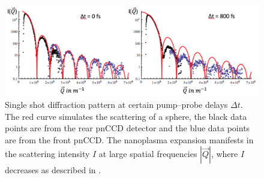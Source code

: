 \begin{figure}
	\centering
		\includegraphics[width=1.0\textwidth]{images/results/Xe-diff-pattern.png}
	\caption[Single-shot diffraction pattern of Xe-cluster at varying time delays]{Single shot diffraction pattern at certain pump--probe delays $\Delta t$. The red curve simulates the scattering of a sphere, the black data points are from the rear pnCCD detector and the blue data points are from the front pnCCD. The nanoplasma expansion manifests in the scattering intensity $I$ at large spatial frequencies $\left|\vec{Q}\right|$, where $I$ decreases as described in \citep{Gorkhover-2016-NatPho}.}
	\label{fig:Xe-only-diff-pattern}
\end{figure}
